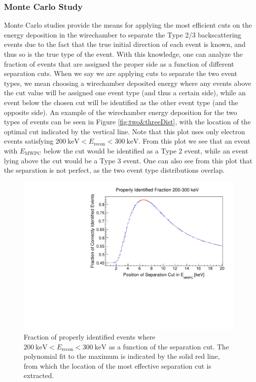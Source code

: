 \subsubsection{Monte Carlo Study}
Monte Carlo studies provide the
means for applying the most efficient cuts on the energy deposition in the wirechamber
to separate the Type 2/3 backscattering events due to the fact that the true initial direction of each event
is known, and thus so is the true type of the event. With this knowledge, one can analyze the fraction of events
that are assigned the proper side as a function of different separation cuts. When we say we are applying cuts to
separate the two event types, we mean choosing a wirechamber deposited energy where
any events above the cut value will be assigned one event type (and thus a certain side), while an event below
the chosen cut will be identified as the other event type (and the opposite side). An example of the
wirechamber energy deposition for the two types of events can be seen in
Figure \ref{fig:two&threeDist}, with the location of the optimal cut indicated by the
vertical line. Note that this plot uses only electron events satisfying
$200\mathrm{~keV}<E_{\mathrm{recon}}<300\mathrm{~keV}$.
From this plot we see that an event with $E_{\mathrm{MWPC}}$
below the cut would be identified as a Type 2 event, while an event lying above the cut
would be a Type 3 event. One can also see from this plot that the separation is not perfect,
as the two event type distributions overlap.

\begin{figure}[h]
  \centering
  \includegraphics[scale=0.55,page=1]{4-UCNACalibrations/properly_identified_2011_200-300keV.pdf}
  \caption{Fraction of properly identified events where
    $200\mathrm{~keV}<E_{\mathrm{recon}}<300\mathrm{~keV}$ as a function of the separation cut.
    The polynomial fit to the maximum is indicated by the solid red line, from which the location
    of the most effective separation cut is extracted.}
  \label{fig:propID}
\end{figure}

